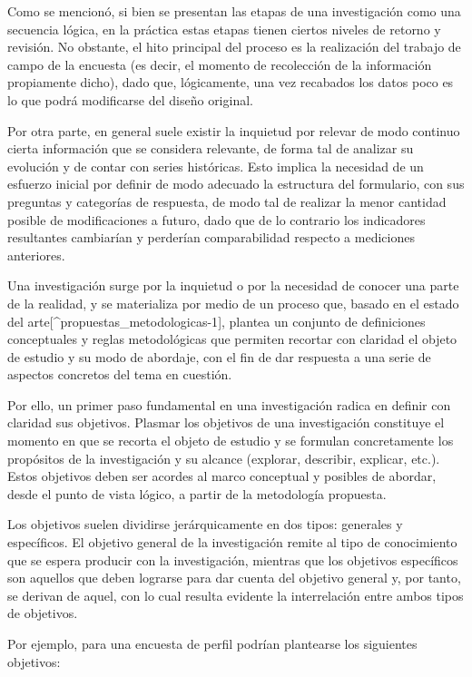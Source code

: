 \documentclass[
]{book}
\begin{document}
Como se mencionó, si bien se presentan las etapas de una investigación como una secuencia lógica, en la práctica estas etapas tienen ciertos niveles de retorno y revisión. No obstante, el hito principal del proceso es la realización del trabajo de campo de la encuesta (es decir, el momento de recolección de la información propiamente dicho), dado que, lógicamente, una vez recabados los datos poco es lo que podrá modificarse del diseño original.

Por otra parte, en general suele existir la inquietud por relevar de modo continuo cierta información que se considera relevante, de forma tal de analizar su evolución y de contar con series históricas. Esto implica la necesidad de un esfuerzo inicial por definir de modo adecuado la estructura del formulario, con sus preguntas y categorías de respuesta, de modo tal de realizar la menor cantidad posible de modificaciones a futuro, dado que de lo contrario los indicadores resultantes cambiarían y perderían comparabilidad respecto a mediciones anteriores.

Una investigación surge por la inquietud o por la necesidad de conocer una parte de la realidad, y se materializa por medio de un proceso que, basado en el estado del arte{[}\^{}propuestas\_metodologicas-1{]}, plantea un conjunto de definiciones conceptuales y reglas metodológicas que permiten recortar con claridad el objeto de estudio y su modo de abordaje, con el fin de dar respuesta a una serie de aspectos concretos del tema en cuestión.

Por ello, un primer paso fundamental en una investigación radica en definir con claridad sus objetivos. Plasmar los objetivos de una investigación constituye el momento en que se recorta el objeto de estudio y se formulan concretamente los propósitos de la investigación y su alcance (explorar, describir, explicar, etc.). Estos objetivos deben ser acordes al marco conceptual y posibles de abordar, desde el punto de vista lógico, a partir de la metodología propuesta.

Los objetivos suelen dividirse jerárquicamente en dos tipos: generales y específicos. El objetivo general de la investigación remite al tipo de conocimiento que se espera producir con la investigación, mientras que los objetivos específicos son aquellos que deben lograrse para dar cuenta del objetivo general y, por tanto, se derivan de aquel, con lo cual resulta evidente la interrelación entre ambos tipos de objetivos.

Por ejemplo, para una encuesta de perfil podrían plantearse los siguientes objetivos:
\end{document}
